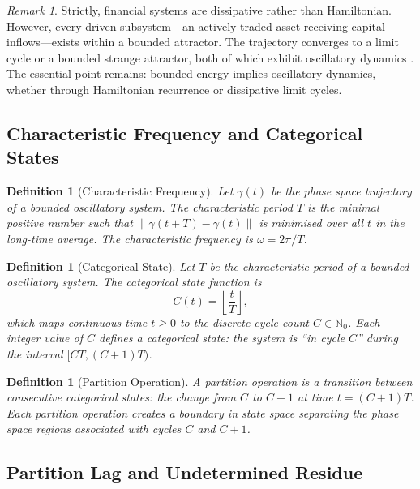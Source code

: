 \documentclass[twocolumn,10pt]{article}
\newtheorem{definition}[theorem]{Definition}
\theoremstyle{remark}
\newtheorem{remark}[theorem]{Remark}
\begin{document}
\begin{remark}
Strictly, financial systems are dissipative rather than Hamiltonian.  However, every driven subsystem---an actively traded asset receiving capital inflows---exists within a bounded attractor.  The trajectory converges to a limit cycle or a bounded strange attractor, both of which exhibit oscillatory dynamics \cite{strogatz2000}.  The essential point remains: bounded energy implies oscillatory dynamics, whether through Hamiltonian recurrence or dissipative limit cycles.
\end{remark}

\subsection{Characteristic Frequency and Categorical States}

\begin{definition}[Characteristic Frequency]
\label{def:char_freq}
Let $\gamma(t)$ be the phase space trajectory of a bounded oscillatory system.  The \emph{characteristic period} $T$ is the minimal positive number such that $\|\gamma(t+T) - \gamma(t)\|$ is minimised over all $t$ in the long-time average.  The \emph{characteristic frequency} is $\omega = 2\pi/T$.
\end{definition}

\begin{definition}[Categorical State]
\label{def:cat_state}
Let $T$ be the characteristic period of a bounded oscillatory system.  The \emph{categorical state function} is
\begin{equation}
    C(t) = \left\lfloor \frac{t}{T} \right\rfloor,
    \label{eq:cat_state}
\end{equation}
which maps continuous time $t \geq 0$ to the discrete cycle count $C \in \mathbb{N}_0$.  Each integer value of $C$ defines a categorical state: the system is ``in cycle $C$'' during the interval $[CT, (C+1)T)$.
\end{definition}

\begin{definition}[Partition Operation]
\label{def:partition_op}
A \emph{partition operation} is a transition between consecutive categorical states: the change from $C$ to $C+1$ at time $t = (C+1)T$.  Each partition operation creates a boundary in state space separating the phase space regions associated with cycles $C$ and $C+1$.
\end{definition}

\subsection{Partition Lag and Undetermined Residue}
\end{document}
